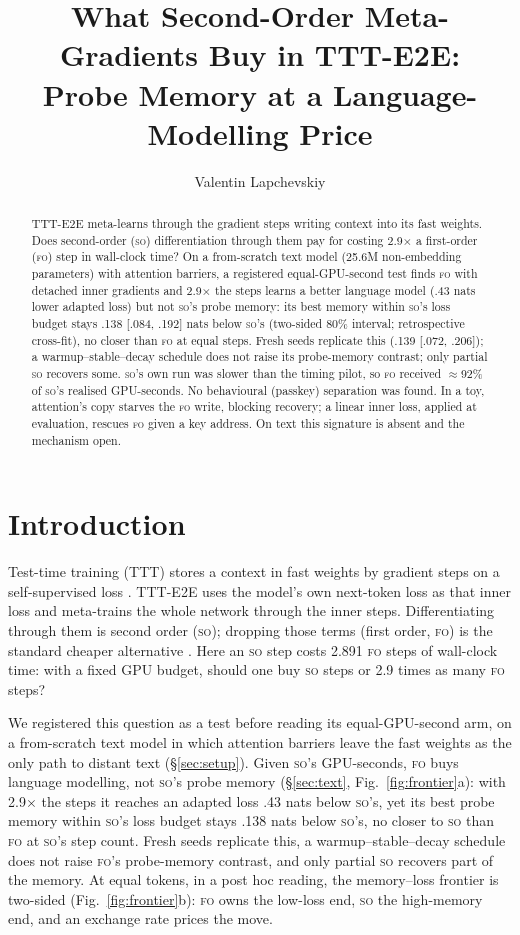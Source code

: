 \documentclass[11pt]{article}
\title{What Second-Order Meta-Gradients Buy in TTT-E2E:\\ Probe Memory at a Language-Modelling Price}
\author{Valentin Lapchevskiy}
\newcommand{\FO}{\textsc{fo}}
\newcommand{\SO}{\textsc{so}}
\begin{document}
\maketitle

\begin{abstract}
TTT-E2E meta-learns through the gradient steps writing context into its fast weights. Does
second-order (\SO) differentiation through them pay for costing 2.9$\times$ a first-order (\FO) step
in wall-clock time? On a from-scratch text model (25.6M non-embedding parameters) with attention
barriers, a registered equal-GPU-second test finds \FO{} with detached inner gradients and
2.9$\times$ the steps learns a better language model (.43 nats lower adapted loss) but not \SO's
probe memory: its best memory within \SO's loss budget stays .138 [.084, .192] nats below \SO's
(two-sided 80\% interval; retrospective cross-fit), no closer than \FO{} at equal steps. Fresh
seeds replicate this (.139 [.072, .206]); a warmup--stable--decay schedule does not raise its
probe-memory contrast; only partial \SO{} recovers some. \SO's own run was slower than the timing
pilot, so \FO{} received $\approx$92\% of \SO's realised GPU-seconds. No behavioural (passkey)
separation was found. In a toy, attention's copy starves the \FO{} write, blocking recovery; a
linear inner loss, applied at evaluation, rescues \FO{} given a key address. On text this signature
is absent and the mechanism open.
\end{abstract}

\section{Introduction}
\label{sec:intro}

Test-time training (TTT) stores a context in fast weights by gradient steps on a self-supervised loss
\citep{sun2024ttt,behrouz2025titans,zhang2025lact}. TTT-E2E \citep{tandon2025e2e} uses the model's own
next-token loss as that inner loss and meta-trains the whole network through the inner steps.
Differentiating through them is second order (\SO); dropping those terms (first order, \FO) is the
standard cheaper alternative \citep{finn2017maml,nichol2018firstorder}. Here an \SO{} step costs 2.891
\FO{} steps of wall-clock time: with a fixed GPU budget, should one buy \SO{} steps or 2.9 times as
many \FO{} steps?

We registered this question as a test before reading its equal-GPU-second arm, on a from-scratch text model in which
attention barriers leave the fast weights as the only path to distant text (\S\ref{sec:setup}).
Given \SO's GPU-seconds, \FO{} buys language modelling, not \SO's probe memory (\S\ref{sec:text},
Fig.~\ref{fig:frontier}a): with 2.9$\times$ the steps it reaches an adapted loss .43 nats below
\SO's, yet its best probe memory within \SO's loss budget stays .138 nats below \SO's, no closer to
\SO{} than \FO{} at \SO's step count. Fresh seeds replicate this, a
warmup--stable--decay schedule does not raise \FO's probe-memory contrast, and only partial \SO{}
recovers part of the memory. At equal tokens, in a post hoc reading, the memory--loss frontier is two-sided
(Fig.~\ref{fig:frontier}b): \FO{} owns the low-loss end, \SO{} the high-memory end, and an exchange
rate prices the move.
\end{document}
